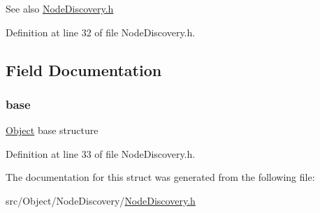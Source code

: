 \begin{DoxySeeAlso}{See also}
\hyperlink{_node_discovery_8h}{NodeDiscovery.h} 
\end{DoxySeeAlso}


Definition at line 32 of file NodeDiscovery.h.



\subsection{Field Documentation}
\hypertarget{struct_node_discovery_a23cf4ef56ba22bed625eab08d6361fa7}{
\subsubsection[{base}]{ {\bf base}}}
\label{struct_node_discovery_a23cf4ef56ba22bed625eab08d6361fa7}
\hyperlink{struct_object}{Object} base structure 

Definition at line 33 of file NodeDiscovery.h.



The documentation for this struct was generated from the following file:\begin{DoxyCompactItemize}
\item 
src/Object/NodeDiscovery/\hyperlink{_node_discovery_8h}{NodeDiscovery.h}\end{DoxyCompactItemize}
